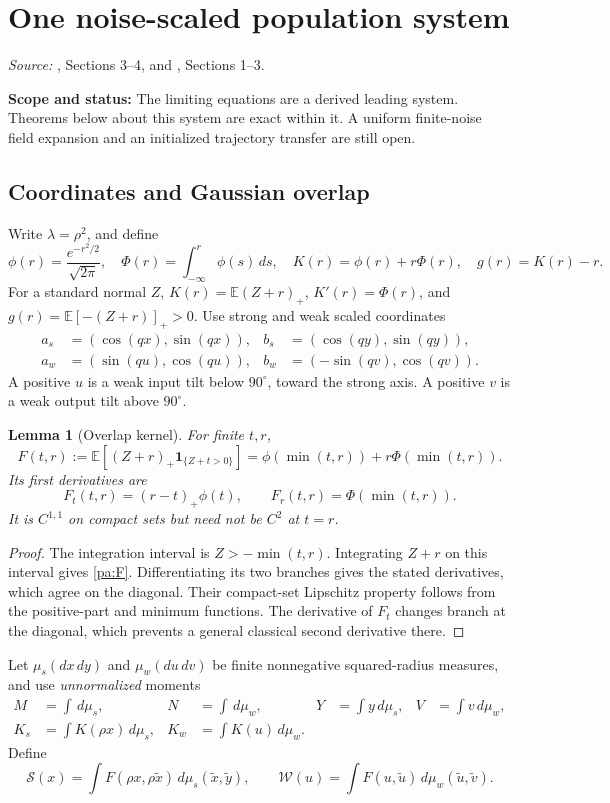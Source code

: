 \documentclass[11pt]{article}
\numberwithin{equation}{section}
\newtheorem{lemma}[proposition]{Lemma}
\theoremstyle{definition}
\theoremstyle{remark}
\newcommand{\E}{\mathbb E}
\newcommand{\1}{\mathbf 1}
\newcommand{\dd}{\,d}
\newcommand{\scope}[1]{\par\noindent\textbf{Scope and status:} #1\par\smallskip}
\newcommand{\source}[1]{\par\noindent\textit{Source:} #1\par\smallskip}
\begin{document}
\section{One noise-scaled population system}\label{pa:scaled}
\source{\cite{TN}, Sections 3--4, and \cite{SP}, Sections 1--3.}
\scope{The limiting equations are a derived leading system. Theorems below
about this system are exact within it. A uniform finite-noise field expansion
and an initialized trajectory transfer are still open.}

\subsection{Coordinates and Gaussian overlap}
Write $\lambda=\rho^2$, and define
\[
 \phi(r)=\frac{e^{-r^2/2}}{\sqrt{2\pi}},\quad
 \Phi(r)=\int_{-\infty}^r\phi(s)\dd s,\quad
 K(r)=\phi(r)+r\Phi(r),\quad g(r)=K(r)-r.
\]
For a standard normal $Z$, $K(r)=\E(Z+r)_+$,
$K'(r)=\Phi(r)$, and $g(r)=\E[-(Z+r)]_+>0$.
Use strong and weak scaled coordinates
\begin{align}\label{pa:charts}
 a_s&=(\cos(qx),\sin(qx)),&b_s&=(\cos(qy),\sin(qy)),\\
 a_w&=(\sin(qu),\cos(qu)),&b_w&=(-\sin(qv),\cos(qv)).\nonumber
\end{align}
A positive $u$ is a weak input tilt below $90^\circ$, toward the strong axis.
A positive $v$ is a weak output tilt above $90^\circ$.

\begin{lemma}[Overlap kernel]\label{pa:overlap}
For finite $t,r$,
\begin{equation}\label{pa:F}
 F(t,r):=\E[(Z+r)_+\1_{\{Z+t>0\}}]
 =\phi(\min(t,r))+r\Phi(\min(t,r)).
\end{equation}
Its first derivatives are
\[
 F_t(t,r)=(r-t)_+\phi(t),\qquad
 F_r(t,r)=\Phi(\min(t,r)).
\]
It is $C^{1,1}$ on compact sets but need not be $C^2$ at $t=r$.
\end{lemma}
\begin{proof}
The integration interval is $Z>-\min(t,r)$. Integrating $Z+r$ on this
interval gives \eqref{pa:F}. Differentiating its two branches gives the
stated derivatives, which agree on the diagonal. Their compact-set
Lipschitz property follows from the positive-part and minimum functions.
The derivative of $F_t$ changes branch at the diagonal, which prevents a
general classical second derivative there.
\end{proof}

Let $\mu_s(dx\,dy)$ and $\mu_w(du\,dv)$ be finite nonnegative squared-radius
measures, and use \emph{unnormalized} moments
\begin{align*}
 M&=\int\dd\mu_s,&N&=\int\dd\mu_w,&Y&=\int y\dd\mu_s,&V&=\int v\dd\mu_w,\\
 K_s&=\int K(\rho x)\dd\mu_s,&K_w&=\int K(u)\dd\mu_w.
\end{align*}
Define
\[
 \mathcal S(x)=\int F(\rho x,\rho\widetilde x)\dd\mu_s(\widetilde x,\widetilde y),
 \qquad
 \mathcal W(u)=\int F(u,\widetilde u)\dd\mu_w(\widetilde u,\widetilde v).
\]
\end{document}

